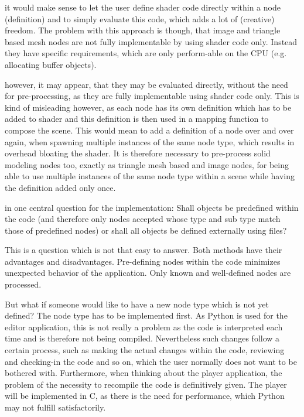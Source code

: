 \documentclass[%
    a4paper,    %
    justified,  %
    nobib,      %
    openany     %
]{tufte-book}
\begin{document}
 it would make sense to let the user define
shader code directly within a node (definition) and to simply evaluate this
code, which adds a lot of (creative) freedom. The problem with this approach is
though, that image and triangle based mesh nodes are not fully implementable by
using shader code only. Instead they have specific requirements, which are only
perform-able on the CPU (e.g. allocating buffer objects).

 however, it may
appear, that they may be evaluated directly, without the need for
pre-processing, as they are fully implementable using shader code only. This is
kind of misleading however, as each node has its own definition which has to be
added to shader and this definition is then used in a mapping function to
compose the scene. This would mean to add a definition of a node over and over
again, when spawning multiple instances of the same node type, which results in
overhead bloating the shader. It is therefore necessary to pre-process solid
modeling nodes too, exactly as triangle mesh based and image nodes, for being
able to use multiple instances of the same node type within a scene while having
the definition added only once.

 in one central question for the
implementation: Shall objects be predefined within the code (and therefore only
nodes accepted whose type and sub type match those of predefined nodes) or shall
all objects be defined externally using files?

This is a question which is not that easy to answer. Both methods have their
advantages and disadvantages. Pre-defining nodes within the code minimizes
unexpected behavior of the application. Only known and well-defined nodes are
processed.

But what if someone would like to have a new node type which is not yet defined?
The node type has to be implemented first. As Python is used for the editor
application, this is not really a problem as the code is interpreted each time
and is therefore not being compiled. Nevertheless such changes follow a certain
process, such as making the actual changes within the code, reviewing and
checking-in the code and so on, which the user normally does not want to be
bothered with. Furthermore, when thinking about the player application, the
problem of the necessity to recompile the code is definitively given. The player
will be implemented in C, as there is the need for performance, which Python may
not fulfill satisfactorily.
\end{document}
